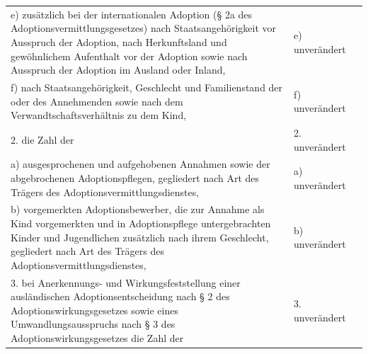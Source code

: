 \documentclass[10pt,a4paper,landscape]{article}
\begin{document}
\begin{longtable}{|L{8.2cm}|L{8.2cm}|L{8.2cm}|}
\hhline{|---|}
e)   \newline zusätzlich bei der internationalen Adoption  \newline (\S{} 2a des Adoptionsvermittlungsgesetzes)  \newline nach Staatsangehörigkeit vor Ausspruch  \newline der Adoption, nach Herkunftsland und  \newline gewöhnlichem Aufenthalt vor der Adoption  \newline sowie nach Ausspruch der Adoption im  \newline Ausland oder Inland, & e) unverändert &  \\
\hhline{|---|}
f)   \newline nach Staatsangehörigkeit, Geschlecht und  \newline Familienstand der oder des Annehmenden  \newline sowie nach dem Verwandtschaftsverhältnis  \newline zu dem Kind, & f) unverändert &  \\
\hhline{|---|}
2.   \newline die Zahl der & 2. unverändert &  \\
\hhline{|---|}
a)   \newline ausgesprochenen und aufgehobenen  \newline Annahmen sowie der abgebrochenen  \newline Adoptionspflegen, gegliedert nach Art des  \newline Trägers des  \newline Adoptionsvermittlungsdienstes, & a) unverändert &  \\
\hhline{|---|}
b)   \newline vorgemerkten Adoptionsbewerber, die zur  \newline Annahme als Kind vorgemerkten und in  \newline Adoptionspflege untergebrachten Kinder  \newline und Jugendlichen zusätzlich nach ihrem  \newline Geschlecht, gegliedert nach Art des  \newline Trägers des  \newline Adoptionsvermittlungsdienstes, & b) unverändert &  \\
\hhline{|---|}
3.  \newline bei Anerkennungs- und  \newline Wirkungsfeststellung einer ausländischen  \newline Adoptionsentscheidung nach \S{} 2 des  \newline Adoptionswirkungsgesetzes sowie eines  \newline Umwandlungsausspruchs nach \S{} 3 des  \newline Adoptionswirkungsgesetzes die Zahl der & 3. unverändert &  \\

\end{longtable}
\end{document}

